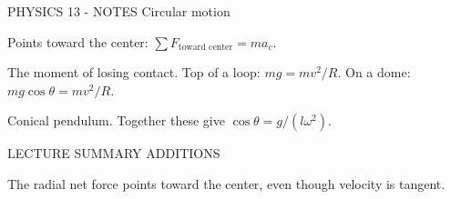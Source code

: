 PHYSICS 13 - NOTES
Circular motion

Points toward the center: \(\sum F_{\text{toward center}} = m a_c\).

The moment of losing contact. Top of a loop: \(mg = mv^2/R\). On a dome: \(mg\cos\theta = mv^2/R\).

Conical pendulum. Together these give \(\cos\theta = g/(l\omega^2)\).

LECTURE SUMMARY ADDITIONS

The radial net force points toward the center, even though velocity is tangent.
